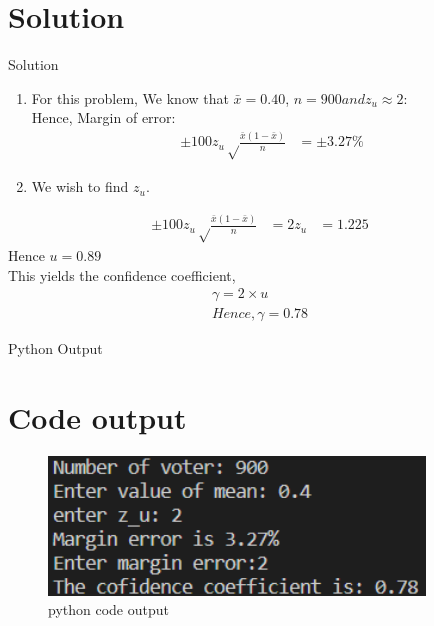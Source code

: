 \documentclass[journal,12pt,twocolumn]{beamer}
\providecommand{\brak}[1]{\ensuremath{\left(#1\right)}}
\begin{document}
\section{Solution}
\begin{frame}{Solution}
\begin{enumerate}[label=(\alph*)]
\item    For this problem, 
We know that $\bar{x}=0.40$, $n=900 and z_u \approx 2:$\\
Hence, Margin of error:
\begin{align}
\label{eq:1}
 \pm 100 z_u \sqrt \frac{\bar{x}\brak{1-\bar{x}}}{n}&= \pm 3.27\%
\end{align}
\item We wish to find $z_u$.
\end{enumerate}
\begin{align}
 \pm 100 z_{u} \sqrt \frac{\bar{x}\brak{1-\bar{x}}}{n}&=2
 z_{u}&=1.225
\end{align}
Hence $u=0.89$\\
This yields the confidence coefficient,
\begin{align}
 \gamma=2 \times u \\
Hence, \gamma=0.78
\end{align}
\end{frame}
\begin{frame}{Python Output}
\section{Code output}
   \begin{figure}[htb!]
\includegraphics[width=10cm]{figures/python_output.png}
\caption{python code output}
\end{figure}
\end{frame}
\end{document}
